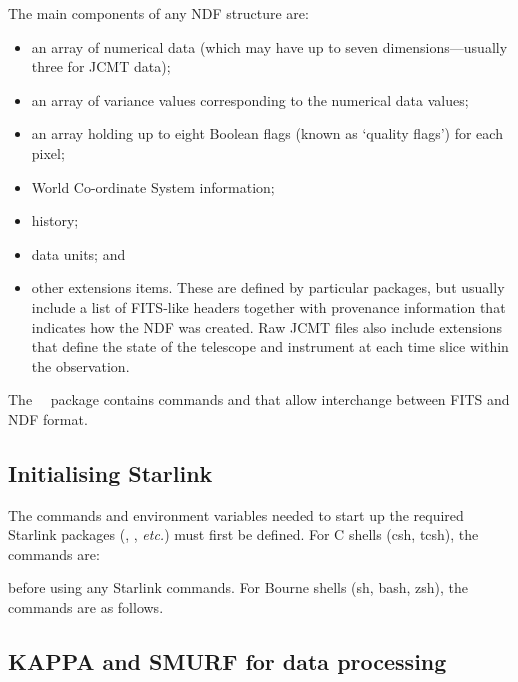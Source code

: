 The main components of any NDF structure are:
\begin{itemize}
\item an array of numerical data (which may have up to seven
dimensions---usually three for JCMT data);
\item an array of variance values corresponding to the numerical data
values;
\item an array holding up to eight Boolean flags (known as `quality
flags') for each pixel;
\item World Co-ordinate System information;
\item history;
\item data units; and
\item other extensions items. These are defined by particular packages,
but usually include a list of FITS-like headers together with provenance
information that indicates how the NDF was created. Raw JCMT files also
include extensions that define the state of the telescope and instrument
at each time slice within the observation.
\end{itemize}

The \starlink\ \convert\ package contains commands  and
 that allow interchange between FITS
and NDF format.

\subsection{Initialising Starlink}
\label{sec:starinit}

The commands and environment variables needed to start up the required
Starlink packages (\smurf \cite{smurf}, \Kappa, \emph{etc.}) must first
be defined. For C shells (csh, tcsh), the commands are:

\begin{terminalv}
\end{terminalv}

before using any Starlink commands. For Bourne shells (sh, bash, zsh), the commands are
as follows.

\begin{terminalv}
\end{terminalv}

\subsection{KAPPA and SMURF for data processing}
\label{sec:packinit}

